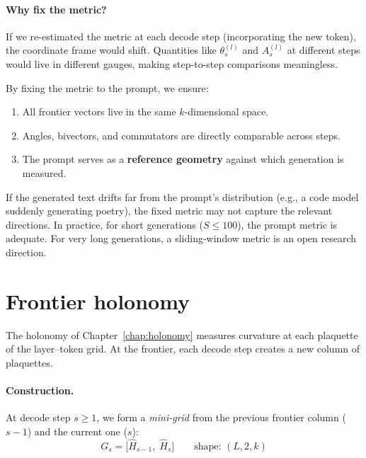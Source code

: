 \documentclass[11pt, twoside, openright]{memoir}
\numberwithin{equation}{chapter}
\begin{document}
\paragraph{Why fix the metric?}

If we re-estimated the metric at each decode step (incorporating the
new token), the coordinate frame would shift.  Quantities like
$\theta^{(l)}_s$ and $A^{(l)}_s$ at different steps would live in
different gauges, making step-to-step comparisons meaningless.

By fixing the metric to the prompt, we ensure:

\begin{enumerate}[nosep]
\item All frontier vectors live in the same $k$-dimensional space.
\item Angles, bivectors, and commutators are directly comparable
  across steps.
\item The prompt serves as a \textbf{reference geometry} against
  which generation is measured.
\end{enumerate}

\begin{pitfall}
If the generated text drifts far from the prompt's distribution
(e.g., a code model suddenly generating poetry), the fixed metric
may not capture the relevant directions.  In practice, for short
generations ($S \leq 100$), the prompt metric is adequate.
For very long generations, a sliding-window metric is an open
research direction.
\end{pitfall}


\section{Frontier holonomy}
\label{sec:frontier-holonomy}

The holonomy of Chapter~\ref{chap:holonomy} measures curvature
at each plaquette of the layer--token grid.  At the frontier,
each decode step creates a new column of plaquettes.

\paragraph{Construction.}
At decode step $s \geq 1$, we form a \emph{mini-grid} from
the previous frontier column ($s-1$) and the current one ($s$):
\begin{equation}
  G_s = \bigl[\hat{H}_{s-1},\; \hat{H}_s\bigr]
  \qquad \text{shape: } (L, 2, k)
\end{equation}
\end{document}
